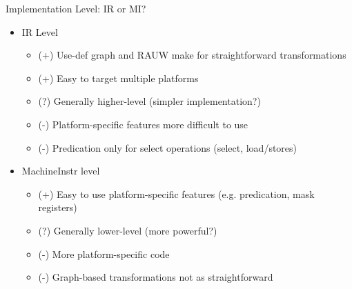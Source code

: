 \begin{frame}{Implementation Level: IR or MI?}

\begin{itemize}
    \item IR Level
    \begin{itemize}
        \item (+) Use-def graph and RAUW make for straightforward transformations
        \item (+) Easy to target multiple platforms
        \item (?) Generally higher-level (simpler implementation?)
        \item (-) Platform-specific features more difficult to use
        \item (-) Predication only for select operations (select, load/stores)
    \end{itemize}

    \item MachineInstr level
    \begin{itemize}
        \item (+) Easy to use platform-specific features (e.g. predication, mask registers)
        \item (?) Generally lower-level (more powerful?)
        \item (-) More platform-specific code
        \item (-) Graph-based transformations not as straightforward
    \end{itemize}
    
\end{itemize}

\end{frame}


%
%
%    
%
